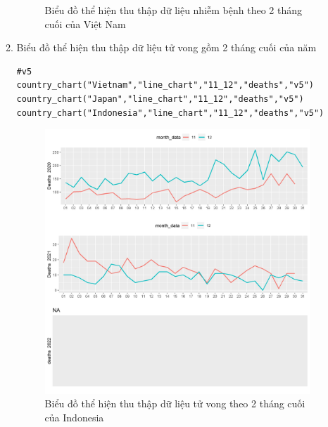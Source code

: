 \documentclass[a4paper]{article}
\theoremstyle{definition}
\begin{document}
\begin{enumerate}[i)]
\begin{enumerate}[1)]
\begin{figure}[htp]
		    \caption{Biểu đồ thể hiện thu thập dữ liệu nhiễm bệnh theo 2 tháng cuối của Việt Nam}
		    \label{fig:my_label}
		\end{figure}
        \newpage
    \newpage
    \item Biểu đồ thể hiện thu thập dữ liệu tử vong gồm 2 tháng cuối của năm
    \begin{lstlisting}[frame=single]  
#v5
country_chart("Vietnam","line_chart","11_12","deaths","v5")
country_chart("Japan","line_chart","11_12","deaths","v5")
country_chart("Indonesia","line_chart","11_12","deaths","v5")
		\end{lstlisting}
        \begin{figure}[htp]
		    \centering
		    \includegraphics[scale = 0.7]{Images/V/v5 Indonesia .jpeg}
		    \caption{Biểu đồ thể hiện thu thập dữ liệu tử vong theo 2 tháng cuối của Indonesia}
		    \label{fig:my_label}
		\end{figure}
		\begin{figure}[htp]
		    \centering

\end{figure}
\end{enumerate}
\end{enumerate}
\end{document}
